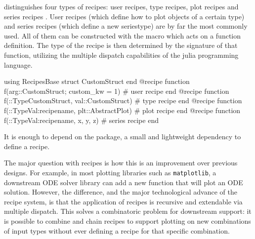 \documentclass[a4paper]{article}
\begin{document}
\Plots distinguishes four types of recipes: user recipes, type recipes, plot recipes and series recipes \cite{HowRecipesActually}.
User recipes (which define how to plot objects of a certain type) and series recipes (which define a new seriestype) are by far the most commonly used.
All of them can be constructed with the  macro which acts on a function definition.
The type of the recipe is then determined by the signature of that function, utilizing the multiple dispatch capabilities of the julia programming language.

\begin{code}[caption=Recipe signatures, label=lst:recipe_signature]
using RecipesBase
struct CustomStruct end
@recipe function f(arg::CustomStruct; custom_kw = 1)            # user recipe
end
@recipe function f(::Type{CustomStruct}, val::CustomStruct)     # type recipe
end
@recipe function f(::Type{Val{:recipename}}, plt::AbstractPlot) # plot recipe
end
@recipe function f(::Type{Val{:recipename}}, x, y, z)           # series recipe
end
\end{code}

It is enough to depend on the  package, a small and lightweight dependency to define a recipe.

The major question with recipes is how this is an improvement over previous designs.
For example, in most plotting libraries such as \texttt{matplotlib}\cite{Hunter:2007}, a downstream ODE solver library can add a new function  that will plot an ODE solution.
However, the difference, and the major technological advance of the \Plots recipe system, is that the application of recipes is recursive and extendable via multiple dispatch.
This solves a combinatoric problem for downstream support: it is possible to combine and chain recipes to support plotting on new combinations of input types without ever defining a recipe for that specific combination.
\end{document}
